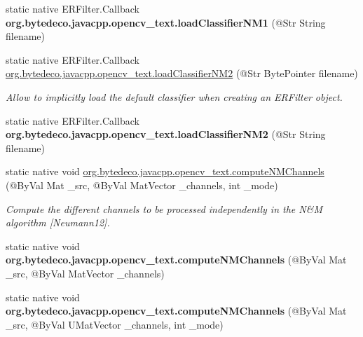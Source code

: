 \begin{DoxyCompactItemize}
\mbox{\label{group__text__detect_gaabcfb566643622636d861d1596c71eeb}} 
static native E\+R\+Filter.\+Callback {\bfseries org.\+bytedeco.\+javacpp.\+opencv\+\_\+text.\+load\+Classifier\+N\+M1} (@Str String filename)
\item 
static native E\+R\+Filter.\+Callback \hyperlink{group__text__detect_gaa41f7358b2e47c7e2b2831ad76410221}{org.\+bytedeco.\+javacpp.\+opencv\+\_\+text.\+load\+Classifier\+N\+M2} (@Str Byte\+Pointer filename)
\begin{DoxyCompactList}\small\item\em Allow to implicitly load the default classifier when creating an E\+R\+Filter object. \end{DoxyCompactList}\item 
\mbox{\label{group__text__detect_gad863c12da040b9e8dab0a7b5792a6c06}} 
static native E\+R\+Filter.\+Callback {\bfseries org.\+bytedeco.\+javacpp.\+opencv\+\_\+text.\+load\+Classifier\+N\+M2} (@Str String filename)
\item 
static native void \hyperlink{group__text__detect_ga67163615b824817020e39c2738a0b122}{org.\+bytedeco.\+javacpp.\+opencv\+\_\+text.\+compute\+N\+M\+Channels} (@By\+Val Mat \+\_\+src, @By\+Val Mat\+Vector \+\_\+channels, int \+\_\+mode)
\begin{DoxyCompactList}\small\item\em Compute the different channels to be processed independently in the N\&M algorithm \mbox{[}Neumann12\mbox{]}. \end{DoxyCompactList}\item 
\mbox{\label{group__text__detect_ga98b14fe60c43d2fce95f2fb68f43acf9}} 
static native void {\bfseries org.\+bytedeco.\+javacpp.\+opencv\+\_\+text.\+compute\+N\+M\+Channels} (@By\+Val Mat \+\_\+src, @By\+Val Mat\+Vector \+\_\+channels)
\item 
\mbox{\label{group__text__detect_ga4e5a409165071c87628ce228492e3bcb}} 
static native void {\bfseries org.\+bytedeco.\+javacpp.\+opencv\+\_\+text.\+compute\+N\+M\+Channels} (@By\+Val Mat \+\_\+src, @By\+Val U\+Mat\+Vector \+\_\+channels, int \+\_\+mode)
\item 
\mbox{\label{group__text__detect_ga2619c4b21f4d3eccf67dfde2f59ccafe}} 

\end{DoxyCompactItemize}
